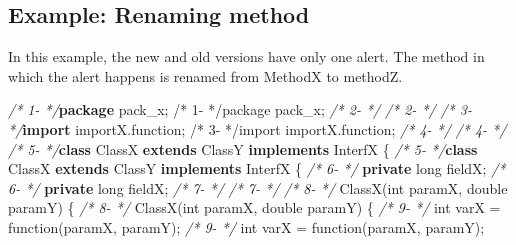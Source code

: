 \documentclass[
]{article}
\newenvironment{Shaded}{\begin{snugshade}}{\end{snugshade}}
\newcommand{\CommentTok}[1]{\textcolor[rgb]{0.56,0.35,0.01}{\textit{#1}}}
\newcommand{\DataTypeTok}[1]{\textcolor[rgb]{0.13,0.29,0.53}{#1}}
\newcommand{\FunctionTok}[1]{\textcolor[rgb]{0.00,0.00,0.00}{#1}}
\newcommand{\ImportTok}[1]{#1}
\newcommand{\KeywordTok}[1]{\textcolor[rgb]{0.13,0.29,0.53}{\textbf{#1}}}
\newcommand{\NormalTok}[1]{#1}
\begin{document}
\begin{landscape}

\subsection{Example: Renaming method} \label{example_rename_method}

In this example, the new and old versions have only one alert. The
method in which the alert happens is renamed from MethodX to methodZ.

\scriptsize

\begin{Shaded}
\begin{Highlighting}[]
\CommentTok{/*  1-   */}\KeywordTok{package}\ImportTok{ pack_x;                                          /*  1-   */package pack_x;}                                          
\CommentTok{/*  2-   */}                                                         \CommentTok{/*  2-   */}                                                         
\CommentTok{/*  3-   */}\KeywordTok{import}\ImportTok{ importX.function;                                 /*  3-   */import importX.function;}                                 
\CommentTok{/*  4-   */}                                                         \CommentTok{/*  4-   */}                                                         
\CommentTok{/*  5-   */}\KeywordTok{class}\NormalTok{ ClassX }\KeywordTok{extends}\NormalTok{ ClassY }\KeywordTok{implements}\NormalTok{ InterfX \{         }\CommentTok{/*  5-   */}\KeywordTok{class}\NormalTok{ ClassX }\KeywordTok{extends}\NormalTok{ ClassY }\KeywordTok{implements}\NormalTok{ InterfX \{         }
\CommentTok{/*  6-   */}    \KeywordTok{private} \DataTypeTok{long}\NormalTok{ fieldX;                                 }\CommentTok{/*  6-   */}    \KeywordTok{private} \DataTypeTok{long}\NormalTok{ fieldX;                                 }
\CommentTok{/*  7-   */}                                                         \CommentTok{/*  7-   */}                                                         
\CommentTok{/*  8-   */}    \FunctionTok{ClassX}\NormalTok{(}\DataTypeTok{int}\NormalTok{ paramX, }\DataTypeTok{double}\NormalTok{ paramY) \{                        }\CommentTok{/*  8-   */}    \FunctionTok{ClassX}\NormalTok{(}\DataTypeTok{int}\NormalTok{ paramX, }\DataTypeTok{double}\NormalTok{ paramY) \{                          }
\CommentTok{/*  9-   */}        \DataTypeTok{int}\NormalTok{ varX = }\FunctionTok{function}\NormalTok{(paramX, paramY);                  }\CommentTok{/*  9-   */}        \DataTypeTok{int}\NormalTok{ varX = }\FunctionTok{function}\NormalTok{(paramX, paramY);                     }

\end{Highlighting}
\end{Shaded}
\end{landscape}
\end{document}
